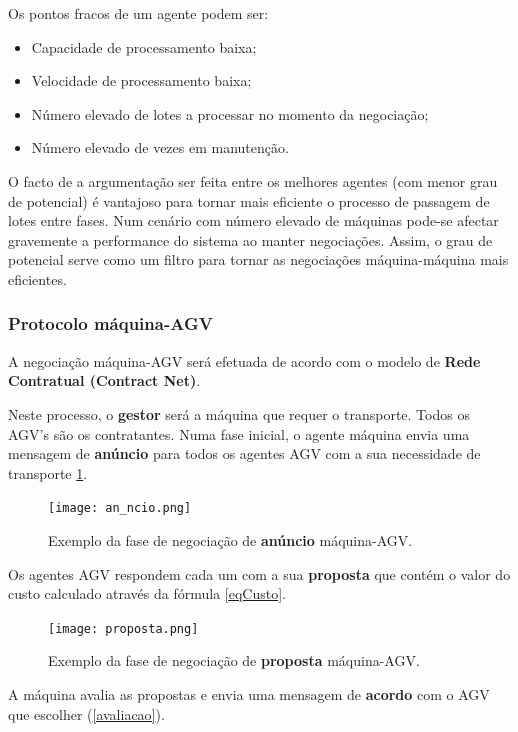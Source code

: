 \begin{titlepage}
Os pontos fracos de um agente podem ser:

\begin{itemize}
\item Capacidade de processamento baixa;
\item Velocidade de processamento baixa;
\item Número elevado de lotes a processar no momento da negociação;
\item Número elevado de vezes em manutenção.
\end{itemize}

O facto de a argumentação ser feita entre os melhores agentes (com menor grau de potencial) é vantajoso para tornar mais eficiente o processo de passagem de lotes entre fases. Num cenário com número elevado de máquinas pode-se afectar gravemente a performance do sistema ao manter negociações. Assim, o grau de potencial serve como um filtro para tornar as negociações máquina-máquina mais eficientes.

\subsubsection{Protocolo máquina-AGV} \label{maq-agv}

A negociação máquina-AGV será efetuada de acordo com o modelo de \textbf{Rede Contratual (Contract Net)}. \newline

Neste processo, o \textbf{gestor} será a máquina que requer o transporte. Todos os AGV's são os contratantes. Numa fase inicial, o agente máquina envia uma mensagem de \textbf{anúncio} para todos os agentes AGV com a sua necessidade de transporte \ref{anuncio}. 

\begin{figure}[H]
  \centering
    \texttt{[image: an\_ncio.png]}
  \caption{Exemplo da fase de negociação de \textbf{anúncio} máquina-AGV.}
  \label{anuncio}
\end{figure}

Os agentes AGV respondem cada um com a sua \textbf{proposta} que contém o valor do custo calculado através da fórmula \ref{eqCusto}.

\begin{figure}[H]
  \centering
    \texttt{[image: proposta.png]}
  \caption{Exemplo da fase de negociação de \textbf{proposta} máquina-AGV.}
  \label{proposta}
\end{figure}

A máquina avalia as propostas e envia uma mensagem de \textbf{acordo} com o AGV que escolher (\ref{avaliacao}).


\end{titlepage}
